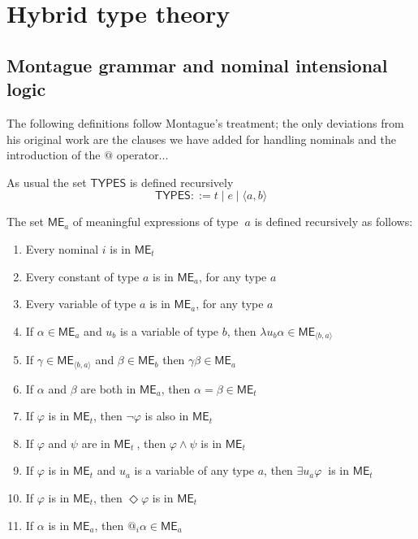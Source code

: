 \section{Hybrid type theory}

\subsection{Montague grammar and nominal intensional logic}

The following definitions follow Montague's treatment; the only deviations
from his original work are the clauses we have added for handling nominals
and the introduction of the $@$ operator...

As usual the set $\mathsf{TYPES}$ is defined recursively 
\begin{equation*}
\mathsf{TYPES}::=t\mid e\mid \langle a,b\rangle
\end{equation*}

The set $\mathsf{ME}_{a}$ of meaningful expressions of type\textbf{\ }$a$ is
defined recursively as follows:

\begin{enumerate}
\item Every nominal $i$ is in $\mathsf{ME}_{t}$

\item Every constant of type $a$ is in $\mathsf{ME}_{a}$, for any type $a$

\item Every variable of type $a$ is in $\mathsf{ME}_{a}$, for any type $a$

\item If $\alpha \in \mathsf{ME}_{a}$ and $u_{b}$ is a variable of type $b$,
then $\lambda u_{b}\alpha \in \mathsf{ME}_{\langle b,a\rangle }$

\item If $\gamma \in \mathsf{ME}_{\langle b,a\rangle }$ and $\beta \in 
\mathsf{ME}_{b}$ then $\gamma \beta \in \mathsf{ME}_{a}$

\item If $\alpha $ and $\beta $ are both in $\mathsf{ME}_{a}$, then $\alpha
=\beta \in \mathsf{ME}_{t}$

\item If $\varphi $ is in $\mathsf{ME}_{t}$, then $\lnot \varphi $ is also
in $\mathsf{ME}_{t}$

\item If $\varphi $ and $\psi $ are in $\mathsf{ME}_{t}\ $, then $\varphi
\wedge \psi $ is in $\mathsf{ME}_{t}$

\item If $\varphi $ is in $\mathsf{ME}_{t}$ and $u_{a}$ is a variable of any
type $a$, then $\exists u_{a}\varphi $ $\ $is in $\mathsf{ME}_{t}$\textbf{\ }

\item If $\varphi $ is in $\mathsf{ME}_{t}$, then $\Diamond \varphi $ is in $%
\mathsf{ME}_{t}$

\item If $\alpha $ is in $\mathsf{ME}_{a}$, then $@_{i}\alpha \in \mathsf{ME}%
_{a}$
\end{enumerate}

